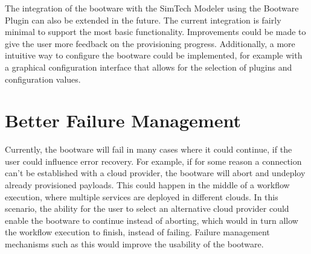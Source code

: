 The integration of the bootware with the SimTech Modeler using the Bootware Plugin can also be extended in the future.
The current integration is fairly minimal to support the most basic functionality.
Improvements could be made to give the user more feedback on the provisioning progress.
Additionally, a more intuitive way to configure the bootware could be implemented, for example with a graphical configuration interface that allows for the selection of plugins and configuration values.

\section{Better Failure Management}

Currently, the bootware will fail in many cases where it could continue, if the user could influence error recovery.
For example, if for some reason a connection can't be established with a cloud provider, the bootware will abort and undeploy already provisioned payloads.
This could happen in the middle of a workflow execution, where multiple services are deployed in different clouds.
In this scenario, the ability for the user to select an alternative cloud provider could enable the bootware to continue instead of aborting, which would in turn allow the workflow execution to finish, instead of failing.
Failure management mechanisms such as this would improve the usability of the bootware.
